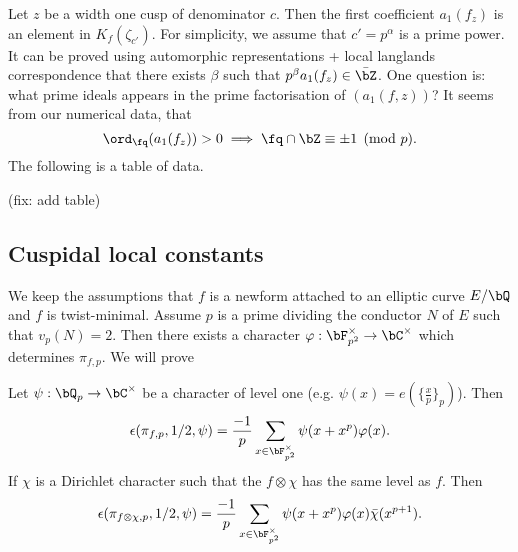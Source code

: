 \documentclass [11pt, proquest] {uwthesis}[2015/03/03]
\begin{document}


Let $z$ be a width one cusp of denominator $c$. Then the first coefficient $a_1(f_z)$ is an element in $K_f(\zeta_{c'})$. For simplicity, we assume that $c' = p^{\alpha}$ is a prime power. It can be proved using automorphic representations + local langlands correspondence that there exists $\beta$ such that $p^\beta a_1(f_z) \in \bar{\bZ}$.  One question is: what prime ideals appears in the prime factorisation of $(a_1(f,z))$?  It seems from our numerical data, that
\[
	\ord_\fq(a_1(f_z)) > 0 \implies \fq \cap \bZ \equiv \pm 1 \pmod {p}.
\]
The following is a table of data. 

(fix: add table)

\subsection{Cuspidal local constants}

We keep the assumptions that $f$ is a newform attached to an elliptic curve $E/\bQ$ and $f$ is twist-minimal. Assume 
$p$ is a prime dividing the conductor $N$ of $E$ such that $v_p(N) = 2$. Then there exists a character 
$\varphi: \bF_{p^2}^{\times} \to \bC^{\times}$ which determines $\pi_{f,p}$. We will prove 

\begin{Lemma} \label{cuspidal constant}
Let $\psi: \bQ_p \to \bC^{\times}$ be a character of level one (e.g. $\psi(x) = e(\{\frac{x}{p}\}_p)$). Then
\[
	\epsilon(\pi_{f,p}, 1/2, \psi)  = \frac{-1}{p} \sum_{x \in \bF_{p^2}^{\times}} \psi( x + x^p) \varphi(x). 
\]
If $\chi$ is a Dirichlet character such that the $f\otimes \chi$ has the same level as $f$. Then 
\[
	\epsilon(\pi_{f \otimes \chi,p}, 1/2, \psi)  = \frac{-1}{p} \sum_{x \in \bF_{p^2}^{\times}} \psi( x + x^p) \varphi(x) \bar{\chi}(x^{p+1}). 
\]
\end{Lemma}
\end{document}
